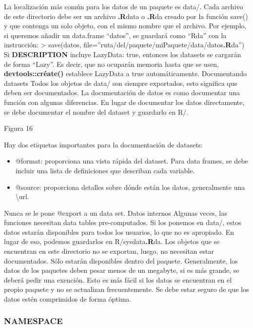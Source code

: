 La localizaci\'on m\'as com\'un para los datos de un paquete es data/. Cada archivo de este
directorio debe ser un archivo \textbf{.R}data o \textbf{.R}da creado por la funci\'on save() y que contenga un
solo objeto, con el mismo nombre que el archivo.
Por ejemplo, si queremos a\~nadir un data.frame “datos”, se guardar\'a como “Rda” con la
instrucci\'on:
> save(datos, file=”ruta/del/paquete/miPaquete/data/datos\textbf{.R}da”)
Si \textbf{DESCRIPTION} incluye LazyData: true, entonces los datasets se cargar\'an de forma
“Lazy”. Es decir, que no ocupar\'an memoria hasta que se usen, \textbf{devtools::cr\'eate()} establece
LazyData a true autom\'aticamente.
Documentando datasets
Todos los objetos de data/ son siempre exportados, esto significa que deben ser
documentados.
La documentaci\'on de datos es como documentar una funci\'on con algunas diferencias. En
lugar de documentar los datos directamente, se debe documentar el nombre del dataset y
guardarlo en R/.

Figura 16

Hay dos etiquetas importantes para la documentaci\'on de datasets:

\begin{itemize}
    \item @format: proporciona una vista r\'apida del dataset. Para data frames, se debe incluir
una lista de definiciones que describan cada variable.
    \item @source: proporciona detalles sobre d\'onde est\'an los datos, generalmente una \textbackslash url{}.
\end{itemize}

Nunca se le pone @export a un data set.
Datos internos
Algunas veces, las funciones necesitan data tables pre-computados. Si los ponemos en data/,
estos datos estar\'an disponibles para todos los usuarios, lo que no es apropiado. En lugar de
eso, podemos guardarlos en R/sysdata\textbf{.R}da. Los objetos que se encuentran en este directorio
no se exportan, luego, no necesitan estar documentados. S\'olo estar\'an disponibles dentro del
paquete.
Generalmente, los datos de los paquetes deben pesar menos de un megabyte, si es m\'as
grande, se deber\'a pedir una exenci\'on. Esto es m\'as f\'acil si los datos se encuentran en el
propio paquete y no se actualizan frecuentemente.
Se debe estar seguro de que los datos est\'en comprimidos de forma \'optima.

\subsubsection{NAMESPACE}


